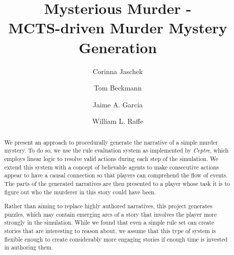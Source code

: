 \documentclass[sigchi,review]{acmart}
\begin{document}
\title{Mysterious Murder -\\
MCTS-driven Murder Mystery Generation}

\author{Corinna Jaschek}

\author{Tom Beckmann}

\author{Jaime A. Garcia}

\author{William L. Raffe}

\renewcommand{\shortauthors}{C. Jaschek, T. Beckmann, J. Garcia, W. Raffe}


\begin{abstract}
  We present an approach to procedurally generate the narrative of a simple murder mystery.
  To do so, we use the rule evaluation system as implemented by \emph{Ceptre}, which employs linear logic to resolve valid actions during each step of the simulation.
  We extend this system with a concept of believable agents to make consecutive actions appear to have a causal connection so that players can comprehend the flow of events.
  The parts of the generated narratives are then presented to a player whose task it is to figure out who the murderer in this story could have been.

  Rather than aiming to replace highly authored narratives, this project generates puzzles, which may contain emerging arcs of a story that involves the player more strongly in the simulation.
  While we found that even a simple rule set can create stories that are interesting to reason about, we assume that this type of system is flexible enough to create considerably more engaging stories if enough time is invested in authoring them.
\end{abstract}
\end{document}
